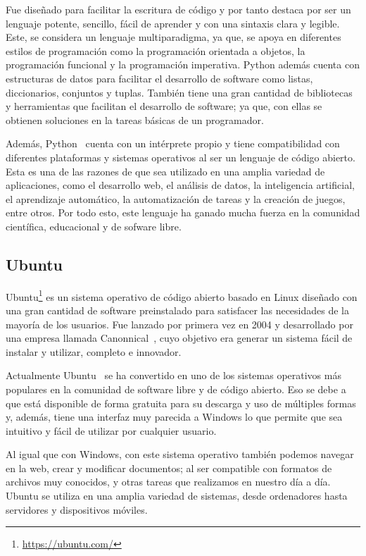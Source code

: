 \documentclass[a4paper, 12pt]{book}
\begin{document}
Fue diseñado para facilitar la escritura de código y por tanto destaca por ser un lenguaje potente, sencillo, fácil de aprender y con una sintaxis clara y legible.
Este, se considera un lenguaje multiparadigma, ya que, se apoya en diferentes estilos de programación como la programación orientada a objetos, la programación funcional y la programación imperativa.   
Python además cuenta con estructuras de datos para facilitar el desarrollo de software como listas, diccionarios, conjuntos y tuplas.
También tiene una gran cantidad de bibliotecas y herramientas que facilitan el desarrollo de software; ya que, con ellas se obtienen soluciones en la tareas básicas de un programador.


Además, Python~\cite{rios2016evaluacion} cuenta con un intérprete propio y tiene compatibilidad con diferentes plataformas y sistemas operativos al ser un lenguaje de código abierto.
Esta es una de las razones de que sea utilizado en una amplia variedad de aplicaciones, como el desarrollo web, el análisis de datos, la inteligencia artificial, el aprendizaje automático, la automatización de tareas y la creación de juegos, entre otros.
Por todo esto, este lenguaje ha ganado mucha fuerza en la comunidad científica, educacional y de sofware libre.


\subsection{Ubuntu} %
\label{sec:ubuntu} %

Ubuntu\footnote{\url{https://ubuntu.com/}} es un sistema operativo de código abierto basado en Linux diseñado con una gran cantidad de software preinstalado para satisfacer las necesidades de la mayoría de los usuarios.
Fue lanzado por primera vez en 2004 y desarrollado por una empresa llamada Canonnical~\cite{martinez2006software}, cuyo objetivo era generar un sistema fácil de instalar y utilizar, completo e innovador. 


Actualmente Ubuntu~\cite{tavera2013software} se ha convertido en uno de los sistemas operativos más populares en la comunidad de software libre y de código abierto.
Eso se debe a que está disponible de forma gratuita para su descarga y uso de múltiples formas y, además, tiene una interfaz muy parecida a Windows lo que permite que sea intuitivo y fácil de utilizar por cualquier usuario.


Al igual que con Windows, con este sistema operativo también podemos navegar en la web, crear y modificar documentos; al ser compatible con formatos de archivos muy conocidos, y otras tareas que realizamos en nuestro día a día. 
Ubuntu se utiliza en una amplia variedad de sistemas, desde ordenadores hasta servidores y dispositivos móviles. 
\end{document}
